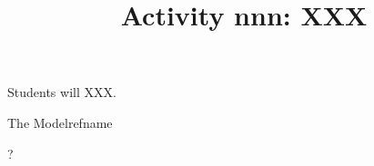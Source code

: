 \documentclass{tufte-handout}
\title{\thecourse\ Activity nnn: XXX}
\date{}
\begin{document}
\maketitle

\begin{objective}
  Students will XXX.
\end{objective}

\begin{model}{The Model}{refname}
\end{model}

\begin{questions}
\item ?
\end{questions}
\end{document}
